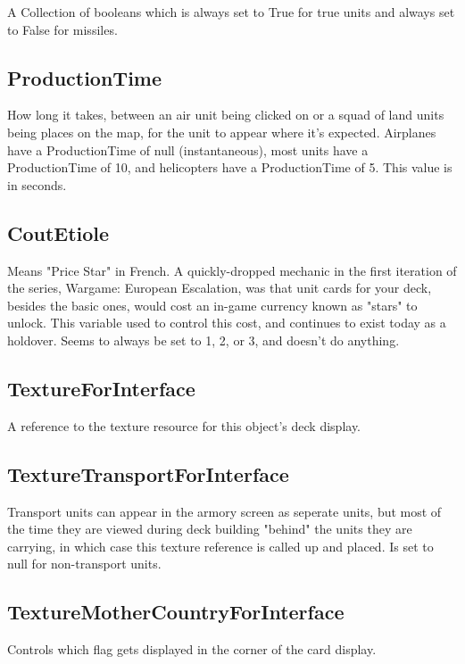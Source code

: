 \documentclass{article}
\begin{document}
A Collection of booleans which is always set to True for true units and always set to False for missiles.

\subsection{ProductionTime}

How long it takes, between an air unit being clicked on or a squad of land units being places on the map, for the unit to appear where it's expected. Airplanes have a ProductionTime of null (instantaneous), most units have a ProductionTime of 10, and helicopters have a ProductionTime of 5. This value is in seconds.

\subsection{CoutEtiole}

Means "Price Star" in French. A quickly-dropped mechanic in the first iteration of the series, Wargame: European Escalation, was that unit cards for your deck, besides the basic ones, would cost an in-game currency known as "stars" to unlock. This variable used to control this cost, and continues to exist today as a holdover. Seems to always be set to 1, 2, or 3, and doesn't do anything.

\subsection{TextureForInterface}

A reference to the texture resource for this object's deck display.

\subsection{TextureTransportForInterface}

Transport units can appear in the armory screen as seperate units, but most of the time they are viewed during deck building "behind" the units they are carrying, in which case this texture reference is called up and placed. Is set to null for non-transport units.

\subsection{TextureMotherCountryForInterface}

Controls which flag gets displayed in the corner of the card display.
\end{document}
